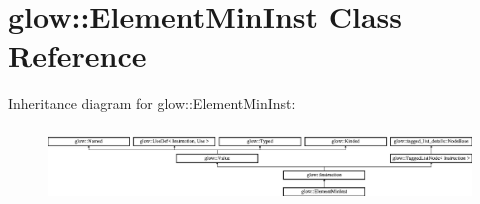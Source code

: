 \hypertarget{classglow_1_1_element_min_inst}{}\section{glow\+:\+:Element\+Min\+Inst Class Reference}
\label{classglow_1_1_element_min_inst}
Inheritance diagram for glow\+:\+:Element\+Min\+Inst\+:\begin{figure}[H]
\begin{center}
\leavevmode
\includegraphics[height=1.991111cm]{classglow_1_1_element_min_inst}
\end{center}
\end{figure}
